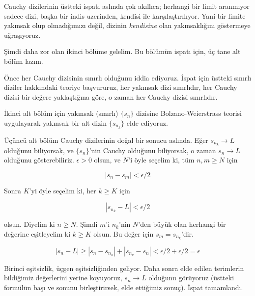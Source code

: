 \documentclass[12pt,fleqn]{article}\usepackage{../../common}
\begin{document}
Cauchy dizilerinin üstteki ispatı aslında çok akıllıca; herhangi bir limit
aranmıyor sadece dizi, başka bir indis uzerinden, kendisi ile
karşılaştırılıyor. Yani bir limite yakınsak olup olmadığımızı değil, dizinin
{\em kendisine} olan yakınsaklığını göstermeye uğraşıyoruz. 

Şimdi daha zor olan ikinci bölüme gelelim. Bu bölümün ispatı için, üç
tane alt bölüm lazım. 

Önce her Cauchy dizisinin sınırlı olduğunu iddia ediyoruz. İspat için
üstteki sınırlı diziler hakkındaki teoriye başvururuz, her yakınsak dizi
sınırlıdır, her Cauchy dizisi bir değere yaklaştığına göre, o zaman her
Cauchy dizisi sınırlıdır.

İkinci alt bölüm için yakınsak (sınırlı) $\{s_n\}$ dizisine Bolzano-Weierstrass
teorisi uygulayarak yakınsak bir alt dizin $\{s_{n_k}\}$ elde ediyoruz. 

Üçüncü alt bölüm Cauchy dizilerinin doğal bir sonucu aslında. Eğer $s_{n_k}
\to L$ olduğunu biliyorsak, ve $\{s_n\}$'nin Cauchy olduğunu biliyorsak, o
zaman $s_n \to L$ olduğunu gösterebiliriz. $\epsilon > 0$ olsun, ve $N$'i
öyle seçelim ki, tüm $n,m \ge N$ için

$$ |s_n - s_m| < \epsilon/2 $$

Sonra $K$'yi öyle seçelim ki, her $k \ge K$ için

$$ |s_{n_k} - L| < \epsilon/2 $$

olsun. Diyelim ki $n \ge N$. Şimdi $m$'i $n_k$'nin $N$'den büyük olan herhangi
bir değerine eşitleyelim ki $k \ge K$ olsun. Bu değer için $s_m =
s_{n_k}$'dir. 

$$  |s_n - L| \ge |s_n - s_{n_k}| + |s_{n_k} - s_n| < 
\epsilon/2 + \epsilon/2 = \epsilon 
$$ 

Birinci eşitsizlik, üçgen eşitsizliğinden geliyor. Daha sonra elde edilen
terimlerin bildiğimiz değerlerini yerine koyuyoruz, $s_n \to L$ olduğunu
görüyoruz (üstteki formülün başı ve sonunu birleştirirsek, elde ettiğimiz
sonuç). İspat tamamlandı. 
\end{document}
